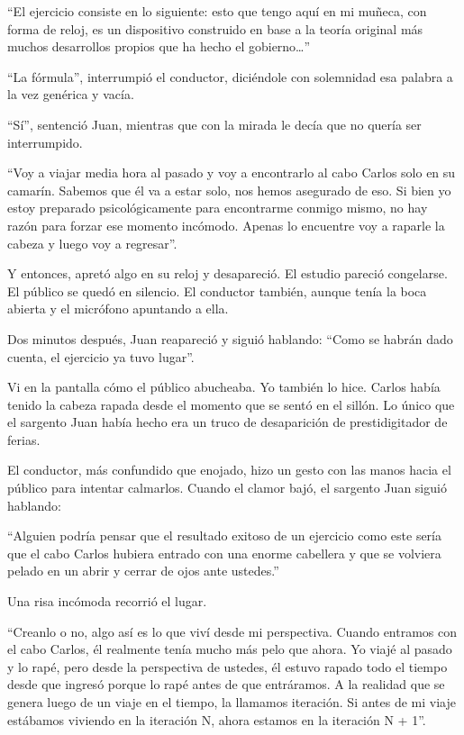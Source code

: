 \documentclass[12pt,twoside,openright]{book}
\begin{document}
“El ejercicio consiste en lo siguiente: esto que tengo aquí en mi muñeca, con forma de reloj, es un dispositivo construido en base a la teoría original más muchos desarrollos propios que ha hecho el gobierno…”

“La fórmula”, interrumpió el conductor, diciéndole con solemnidad esa palabra a la vez genérica y vacía.

“Sí”, sentenció Juan, mientras que con la mirada le decía que no quería ser interrumpido.

“Voy a viajar media hora al pasado y voy a encontrarlo al cabo Carlos solo en su camarín. Sabemos que él va a estar solo, nos hemos asegurado de eso. Si bien yo estoy preparado psicológicamente para encontrarme conmigo mismo, no hay razón para forzar ese momento incómodo. Apenas lo encuentre voy a raparle la cabeza y luego voy a regresar”.

Y entonces, apretó algo en su reloj y desapareció. El estudio pareció congelarse. El público se quedó en silencio. El conductor también, aunque tenía la boca abierta y el micrófono apuntando a ella.

Dos minutos después, Juan reapareció y siguió hablando: “Como se habrán dado cuenta, el ejercicio ya tuvo lugar”.

Vi en la pantalla cómo el público abucheaba. Yo también lo hice. Carlos había tenido la cabeza rapada desde el momento que se sentó en el sillón. Lo único que el sargento Juan había hecho era un truco de desaparición de prestidigitador de ferias.

El conductor, más confundido que enojado, hizo un gesto con las manos hacia el público para intentar calmarlos. Cuando el clamor bajó, el sargento Juan siguió hablando:

“Alguien podría pensar que el resultado exitoso de un ejercicio como este sería que el cabo Carlos hubiera entrado con una enorme cabellera y que se volviera pelado en un abrir y cerrar de ojos ante ustedes.”

Una risa incómoda recorrió el lugar.

“Creanlo o no, algo así es lo que viví desde mi perspectiva. Cuando entramos con el cabo Carlos, él realmente tenía mucho más pelo que ahora. Yo viajé al pasado y lo rapé, pero desde la perspectiva de ustedes, él estuvo rapado todo el tiempo desde que ingresó porque lo rapé antes de que entráramos. A la realidad que se genera luego de un viaje en el tiempo, la llamamos iteración. Si antes de mi viaje estábamos viviendo en la iteración N, ahora estamos en la iteración N + 1”.
\end{document}
